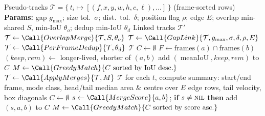 \begin{algorithm}[ht]
\caption{\textsc{LinkTracks} --- offline fragment linker for MOT pseudo-tracks}
\label{alg:linktracks}
\begin{algorithmic}[1]
\Require Pseudo-tracks $\mathcal{T}=\{\,t_i \mapsto [(f,x,y,w,h,c,\ell),\dots]\,\}$ (frame-sorted rows)
\Statex \textbf{Params:} gap $g_{\max}$; size tol.\ $\sigma$; dist.\ tol.\ $\delta$; position flag $\rho$; edge $E$;
\Statex \hspace{3.1em} overlap min-shared $S$, min-IoU $\theta_{o}$; dedup min-IoU $\theta_{d}$
\Ensure Linked tracks $\mathcal{T}'$
\Statex
\State $\mathcal{T} \gets \Call{OverlapMerge}{\mathcal{T},S,\theta_{o}}$ 
\State $\mathcal{T} \gets \Call{GapLink}{\mathcal{T},g_{\max},\sigma,\delta,\rho,E}$ 
\State $\mathcal{T} \gets \Call{PerFrameDedup}{\mathcal{T},\theta_{d}}$ 
\State \Return $\mathcal{T}$
\Statex
{} 
  \Repeat
    \State $C \gets \emptyset$
      \State $F \gets \text{frames}(a)\cap\text{frames}(b)$
        \State $(\textit{keep},\textit{rem}) \gets$ longer-lived, shorter of $(a,b)$
        \State add $(\operatorname{mean IoU},\textit{keep},\textit{rem})$ to $C$
      \EndIf
    \EndFor
    \State $M \gets \Call{GreedyMatch}{C \text{ sorted by IoU desc.}}$ 
    \State $\mathcal{T} \gets \Call{ApplyMerges}{\mathcal{T},M}$
  \State \Return $\mathcal{T}$
\EndProcedure
\Statex
{} 
  \Repeat
    \State for each $t$, compute summary: start/end frame, mode class, head/tail
    \Statex \hspace{1.5em} median area \& centre over $E$ edge rows, tail velocity, box diagonals
    \State $C \gets \emptyset$
     
      \State $s \gets \Call{MergeScore}{a,b}$; \textbf{if} $s\neq\textsc{nil}$ \textbf{then} add $(s,a,b)$ to $C$
    \EndFor
    \State $M \gets \Call{GreedyMatch}{C \text{ sorted by score asc.}}$

\end{algorithmic}
\end{algorithm}
